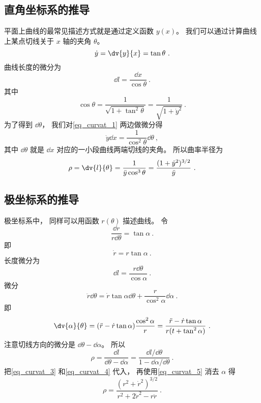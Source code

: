 \subsection{直角坐标系的推导}
平面上曲线的最常见描述方式就是通过定义函数 $y(x)$。 我们可以通过计算曲线上某点切线关于 $x$ 轴的夹角 $\theta$。
\begin{equation}\label{eq_curvat_1}
\dot y = \dv{y}{x} = \tan \theta~.
\end{equation}
曲线长度的微分为
\begin{equation}
\dd{l} = \frac{\dd{x}}{\cos\theta}~.
\end{equation}
其中
\begin{equation}\label{eq_curvat_2}
\cos\theta = \frac{1}{\sqrt{1 + \tan^2\theta}} = \frac{1}{\sqrt{1 + \dot y^2}}~.
\end{equation}
为了得到 $\dd{\theta}$， 我们对\autoref{eq_curvat_1} 两边做微分得
\begin{equation}
\ddot y \dd{x} = \frac{1}{\cos^2\theta} \dd{\theta}~,
\end{equation}
其中 $\dd{\theta}$ 就是 $\dd{x}$ 对应的一小段曲线两端切线的夹角。 所以曲率半径为
\begin{equation}
\rho = \dv{l}{\theta} = \frac{1}{\ddot y\cos^3\theta} = \frac{(1 + \dot y^2)^{3/2}}{\ddot y}~.
\end{equation}

\subsection{极坐标系的推导}
极坐标系中， 同样可以用函数 $r(\theta)$ 描述曲线。
令
\begin{equation}
\frac{\dd{r}}{r \dd{\theta}} = \tan\alpha~.
\end{equation}
即
\begin{equation}\label{eq_curvat_5}
\dot r = r\tan\alpha~.
\end{equation}
长度微分为
\begin{equation}
\dd{l} = \frac{r\dd{\theta}}{\cos\alpha}~.
\end{equation}
微分
\begin{equation}
\ddot r\dd{\theta} = \dot r\tan\alpha\dd{\theta} + \frac{r}{\cos^2\alpha}\dd{\alpha}~.
\end{equation}
即
\begin{equation}\label{eq_curvat_4}
\dv{\alpha}{\theta} = (\ddot r - \dot r \tan\alpha) \frac{\cos^2\alpha}{r} = \frac{\ddot r - \dot r\tan\alpha}{r(t + \tan^2\alpha)}~.
\end{equation}
注意切线方向的微分是 $\dd{\theta} - \dd{\alpha}$。 所以
\begin{equation}
\rho = \frac{\dd{l}}{\dd{\theta} - \dd{\alpha}} = \frac{\dd{l}/\dd{\theta}}{1 - \dd{\alpha}/\dd{\theta}}~.
\end{equation}
把\autoref{eq_curvat_3} 和\autoref{eq_curvat_4} 代入， 再使用\autoref{eq_curvat_5} 消去 $\alpha$ 得
\begin{equation}
\rho = \frac{(r^2 + \dot r^2)^{3/2}}{r^2 + 2\dot r^2 - r\ddot r}~.
\end{equation}
